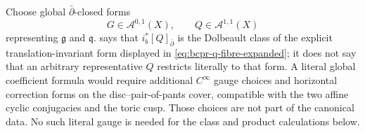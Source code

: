 \begin{remark}
\label{rem:bcpr-literal-gauge}
Choose global $\bar\partial$-closed forms
\begin{equation}
 G\in\mathcal A^{0,1}(X),\qquad
 Q\in\mathcal A^{1,1}(X)
\label{eq:bcpr-global-representatives}
\end{equation}
representing $\mathfrak g$ and $\mathfrak q$.
 says that
$i_b^*[Q]_{\bar\partial}$ is the Dolbeault class of the explicit
translation-invariant
form displayed in \cref{eq:bcpr-q-fibre-expanded}; it does not say that an arbitrary
representative $Q$ restricts literally to that form.  A literal global
coefficient formula would require additional $C^\infty$ gauge choices and
horizontal correction forms on the disc--pair-of-pants cover, compatible
with the two affine cyclic conjugacies and the toric cusp.  Those choices
are not part of the canonical data.  No such literal gauge is needed for
the class and product calculations below.
\end{remark}

